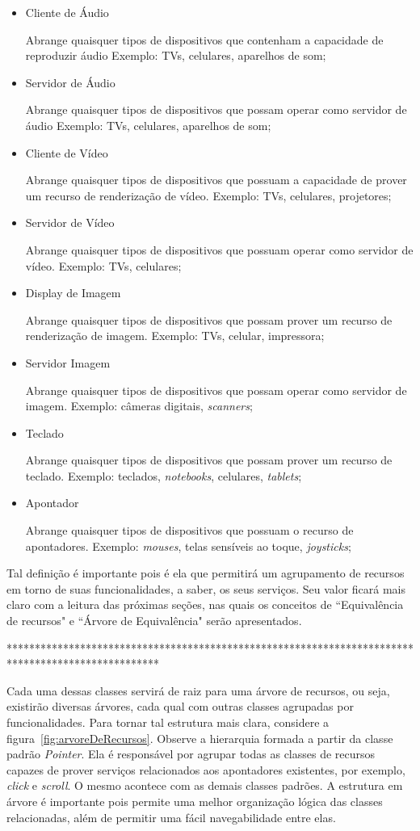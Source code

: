 \begin{itemize}
	\item Cliente de Áudio
		
		Abrange quaisquer tipos de dispositivos que contenham a capacidade de reproduzir áudio Exemplo: TVs, celulares, aparelhos de som;
	\item Servidor de Áudio
		
		Abrange quaisquer tipos de dispositivos que possam operar como servidor de áudio Exemplo: TVs, celulares, aparelhos de som;
	\item Cliente de Vídeo
		
		Abrange quaisquer tipos de dispositivos que possuam a capacidade de prover um recurso de renderização de vídeo. Exemplo: TVs, celulares, projetores;
	\item Servidor de Vídeo
		
		Abrange quaisquer tipos de dispositivos que possuam operar como servidor de vídeo. Exemplo: TVs, celulares;
	\item Display de Imagem
		
		Abrange quaisquer tipos de dispositivos que possam prover um recurso de renderização de imagem. Exemplo: TVs, celular, impressora;
	\item Servidor Imagem
		
		Abrange quaisquer tipos de dispositivos que possam operar como servidor de imagem. Exemplo: câmeras digitais, \emph{scanners};
	\item Teclado
		
		Abrange quaisquer tipos de dispositivos que possam prover um recurso de teclado. Exemplo: teclados, \emph{notebooks}, celulares, \emph{tablets};
	\item Apontador
		
		Abrange quaisquer tipos de dispositivos que possuam o recurso de apontadores. Exemplo: \emph{mouses}, telas sensíveis ao toque, \emph{joysticks};
\end{itemize}

Tal definição é importante pois é ela que permitirá um agrupamento de recursos em torno de suas funcionalidades, a saber, os seus serviços. Seu valor ficará mais claro com a leitura das próximas seções, nas quais os conceitos de ``Equivalência de recursos" e ``Árvore de Equivalência" serão apresentados.


***************************************************************************************************



Cada uma dessas classes servirá de raiz para uma árvore de recursos, ou seja, existirão diversas árvores, cada qual com outras classes agrupadas por funcionalidades. Para tornar tal estrutura mais clara, considere a figura~\ref{fig:arvoreDeRecursos}. Observe a hierarquia formada a partir da classe padrão \emph{Pointer}. Ela é responsável por agrupar todas as classes de recursos capazes de prover serviços relacionados aos apontadores existentes, por exemplo, \emph{click} e \emph{scroll}. O mesmo acontece com as demais classes padrões. A estrutura em árvore é importante pois permite uma melhor organização lógica das classes relacionadas, além de permitir uma fácil navegabilidade entre elas.

